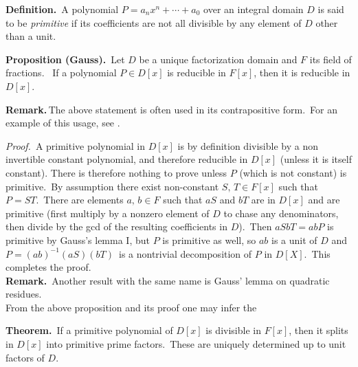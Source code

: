 \documentclass[12pt]{article}
\begin{document}

\textbf{Definition.}\, A polynomial $P=a_nx^n+\cdots+a_0$ over an integral domain
$D$ is said to be \emph{primitive} if its coefficients are not all divisible
by any element of $D$ other than a unit.

\textbf{Proposition (Gauss).}\, Let $D$ be a unique factorization domain and $F$ its field of fractions. \,
If a polynomial $P\in D[x]$ is reducible in $F[x]$, then it is reducible in $D[x]$.

\textbf{Remark.}\,The above statement is often used in its contrapositive form.\, For an example of this usage, see .

\emph{Proof.}\, A primitive polynomial in $D[x]$ is by definition divisible by a non invertible constant polynomial, and therefore reducible in $D[x]$ (unless it is itself constant). There is therefore nothing to prove unless $P$ (which is not constant) is primitive.\, By assumption there exist non-constant $S,\,T \in F[x]$ such that\, $P=ST$.\, There are elements $a,\,b\in F$ such that $aS$ and $bT$ are in $D[x]$ and are primitive (first multiply by a nonzero element of $D$ to chase any denominators, then divide by the gcd of the resulting coefficients in $D$).\, Then $aSbT = abP$ is primitive by Gauss's lemma I, but $P$ is primitive as well, so $ab$ is a unit of $D$ and\, $P=(ab)^{-1}(aS)(bT)$\, is a nontrivial decomposition of $P$ in $D[X]$.\, This completes the proof.\\

\textbf{Remark.}\, Another result with the same name is Gauss' lemma on quadratic residues.\\

From the above proposition and its proof one may infer the

\textbf{Theorem.}\, If a primitive polynomial of $D[x]$ is divisible in $F[x]$, then it splits in $D[x]$ into primitive prime factors.\, These are uniquely determined up to unit factors of $D$.
\end{document}
